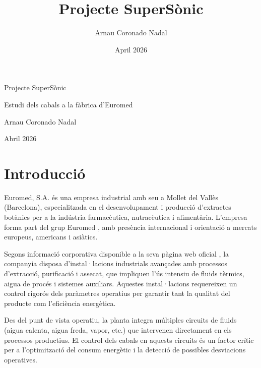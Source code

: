 \documentclass[11pt]{article}
\title{Projecte SuperSònic}
\author{Arnau Coronado Nadal}
\date{April 2026}
\begin{document}
\begin{center}
    \vspace*{3cm}

    {\Huge Projecte SuperSònic}

    \vspace{1cm}
    {\Large Estudi dels cabals a la fàbrica d'Euromed}

    \vspace{2cm}
    {\large Arnau Coronado Nadal}

    \vspace{1cm}
    {\normalsize Abril 2026}
\end{center}

\thispagestyle{emptystyle}
\newpage

\thispagestyle{emptystyle}
\renewcommand{\contentsname}{Taula de continguts}
\tableofcontents
\newpage


\section{Introducció}

Euromed, S.A. és una empresa industrial amb seu a Mollet del Vallès (Barcelona), especialitzada en el desenvolupament i producció d'extractes botànics per a la indústria farmacèutica, nutracèutica i alimentària.
L'empresa forma part del grup Euromed \cite{Euromed2024}, amb presència internacional i orientació a mercats europeus, americans i asiàtics.

Segons informació corporativa disponible a la seva pàgina web oficial \cite{Euromed2024}, la companyia disposa d'instal·lacions industrials avançades amb processos d'extracció, purificació i assecat, que impliquen l'ús intensiu de fluids tèrmics, aigua de procés i sistemes auxiliars. Aquestes
instal·lacions requereixen un control rigorós dels paràmetres operatius per garantir tant la qualitat del producte com l'eficiència energètica.

Des del punt de vista operatiu, la planta integra múltiples circuits de fluids (aigua calenta, aigua freda, vapor, etc.) que intervenen directament en els processos productius. El control dels cabals en aquests circuits és un factor crític per a l'optimització del consum energètic i la detecció de possibles desviacions operatives.
\end{document}
